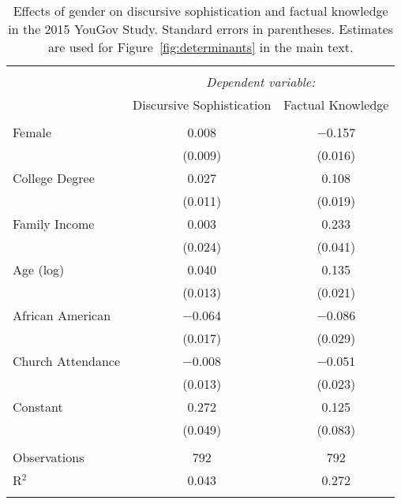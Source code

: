 
\begin{table}[!htbp] \centering 
  \caption[Effects of gender on discursive sophistication and factual knowledge in the 
  2015 YouGov Study]{Effects of gender on discursive sophistication and factual knowledge in the 
          2015 YouGov Study. Standard errors in parentheses. Estimates are used for 
          Figure~\ref{fig:determinants} in the main text.} 
  \label{tab:determinants_yg} 
\begin{tabular}{@{\extracolsep{0pt}}lcc} 
\\[-1.8ex]\hline 
\hline \\[-1.8ex] 
 & \multicolumn{2}{c}{\textit{Dependent variable:}} \\ 
\cline{2-3} 
 & Discursive Sophistication & Factual Knowledge \\ 
\hline \\[-1.8ex] 
 Female & 0.008 & $-$0.157 \\ 
  & (0.009) & (0.016) \\ 
  College Degree & 0.027 & 0.108 \\ 
  & (0.011) & (0.019) \\ 
  Family Income & 0.003 & 0.233 \\ 
  & (0.024) & (0.041) \\ 
  Age (log) & 0.040 & 0.135 \\ 
  & (0.013) & (0.021) \\ 
  African American & $-$0.064 & $-$0.086 \\ 
  & (0.017) & (0.029) \\ 
  Church Attendance & $-$0.008 & $-$0.051 \\ 
  & (0.013) & (0.023) \\ 
  Constant & 0.272 & 0.125 \\ 
  & (0.049) & (0.083) \\ 
 \hline \\[-1.8ex] 
Observations & 792 & 792 \\ 
R$^{2}$ & 0.043 & 0.272 \\ 
\hline 
\hline \\[-1.8ex] 
\end{tabular} 
\end{table} 
